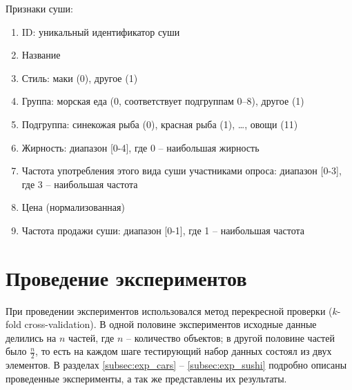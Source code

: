 		\noindent Признаки суши:
		\vspace{-0.7em}
		\begin{enumerate}[itemsep=-1.5mm]
			\item ID: уникальный идентификатор суши
			\item Название
			\item Стиль: маки (0), другое (1)
			\item Группа: морская еда (0, соответствует подгруппам 0--8), другое (1)
			\item Подгруппа: синекожая рыба (0), красная рыба (1), \dots, овощи (11) 
			\item Жирность: диапазон [0-4], где 0 -- наибольшая жирность
			\item Частота употребления этого вида суши участниками опроса: диапазон [0-3], где 3 -- наибольшая частота
			\item Цена (нормализованная)
			\item Частота продажи суши: диапазон [0-1], где 1 -- наибольшая частота
		\end{enumerate}
	

\section{Проведение экспериментов}
\label{subsec:experiments_desc}
	При проведении экспериментов использовался метод перекресной проверки ($k$-fold cross-validation)\cite{Hastie:2001}. В одной половине экспериментов исходные данные делились на $n$ частей, где $n$ – количество объектов; в другой половине частей было $\frac{n}{2}$, то есть на каждом шаге тестирующий набор данных состоял из двух элементов. В разделах \ref{subsec:exp_cars} -- \ref{subsec:exp_sushi} подробно описаны проведенные эксперименты, а так же представлены их результаты.
	

